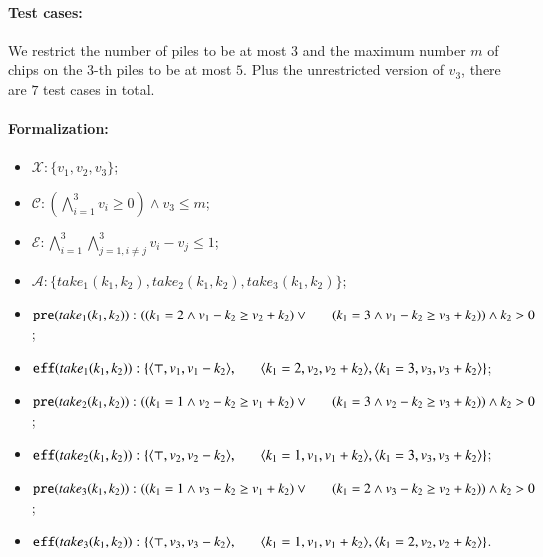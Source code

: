 \documentclass[review]{elsarticle}
\newcommand{\set}[1]{\{ #1 \}}
\newcommand{\tuple}[1]{\langle {#1} \rangle}
\newcommand{\true}{\top}
\newcommand{\statevar}{\mathcal{X}}
\newcommand{\act}{\mathcal{A}}
\newcommand{\constraint}{\mathcal{C}}
\newcommand{\estate}{\mathcal{E}}
\newcommand{\pre}{\mathtt{pre}}
\newcommand{\eff}{\mathtt{eff}}
\begin{document}
\paragraph{Test cases:}
We restrict the number of piles to be at most $3$ and the maximum number $m$ of chips on the $3$-th piles to be at most $5$.
Plus the unrestricted version of $v_3$, there are $7$ test cases in total.

\paragraph{Formalization:}

\begin{itemize}
	\item $\statevar: \set{v_1, v_2, v_3}$;
	\item $\constraint:(\bigwedge_{i=1}^{3} v_i \ge 0) \wedge v_3 \le m$;
	\item $\estate:\bigwedge_{i=1}^{3}\bigwedge_{j=1,i\neq j}^{3} v_i - v_j \le 1$;
	\item $\act:\set{take_1(k_1, k_2),take_2(k_1, k_2),take_3(k_1, k_2)}$;
	\item $\pre(take_1(k_1, k_2)) : ( (k_1 = 2 \wedge v_1-k_2 \ge v_2 +k_2)\vee \\ \hspace*{6mm}
	(k_1 = 3 \wedge 
	v_1-k_2 \ge v_3 +k_2 )) \wedge k_2 > 0$;
	\item $\eff(take_1(k_1, k_2)) : \set{\tuple{\true, v_1, v_1-k_2},\\ \hspace*{6mm}
		\tuple{k_1 = 2, v_2, v_2+k_2}, \tuple{k_1 = 3, v_3, v_3+k_2}}$;
	\item $\pre(take_2(k_1, k_2)) : ( (k_1 = 1 \wedge v_2-k_2 \ge v_1 +k_2)\vee \\ \hspace*{6mm}
	(k_1 = 3 \wedge
	v_2-k_2 \ge v_3 +k_2 )) \wedge k_2 > 0$;
	\item $\eff(take_2(k_1, k_2)) : \set{\tuple{\true, v_2, v_2-k_2}, \\ \hspace*{6mm}
		\tuple{k_1 = 1, v_1, v_1+k_2}, \tuple{k_1 = 3, v_3, v_3+k_2}}$;
	\item $\pre(take_3(k_1, k_2)) : ( (k_1 = 1 \wedge v_3-k_2 \ge v_1 +k_2)\vee \\ \hspace*{6mm}
	(k_1 = 2 \wedge
	v_3-k_2 \ge v_2 +k_2 )) \wedge k_2 > 0$;
	\item $\eff(take_3(k_1, k_2)) : \set{\tuple{\true, v_3, v_3-k_2}, \\ \hspace*{6mm}
		\tuple{k_1 = 1, v_1, v_1+k_2}, \tuple{k_1 = 2, v_2, v_2+k_2}}$.
\end{itemize}
\end{document}
